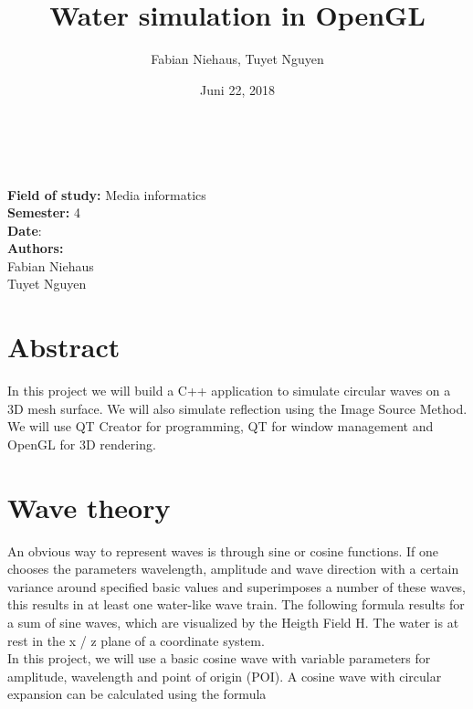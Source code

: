 \documentclass[12pt,a4paper]{scrartcl}
\title{Water simulation in OpenGL}
\author{Fabian Niehaus, Tuyet Nguyen}
\date{Juni 22, 2018}
\begin{document}
\begin{titlepage}
	\centering
	\ \\[2cm]
	{\huge\textbf{\@title}} 
	\\[3cm]
	\large
	\textbf{Field of study:} Media informatics \\
	\textbf{Semester:} 4
	\\[2cm]
	\textbf{Date}: \@date
	\\[2cm]
	\textbf {Authors:}
	\\Fabian Niehaus
	\\Tuyet Nguyen
\end{titlepage}

\newpage
\setcounter{page}{0}
\tableofcontents
\newpage
\listoffigures

\newpage
\ofoot[]{\pagemark}
\normalsize

\section{Abstract}
In this project we will build a C++ application to simulate circular waves on a 3D mesh surface. We will also simulate reflection using the Image Source Method. We will use QT Creator for programming, QT for window management and OpenGL for 3D rendering.

\section{Wave theory}\label{wave-theory}
An obvious way to represent waves is through sine or cosine functions. If one chooses the parameters wavelength, amplitude and wave direction with a certain variance around specified basic values and superimposes a number of these waves, this results in at least one water-like wave train. The following formula results for a sum of sine waves, which are visualized by the Heigth Field H. The water is at rest in the x / z plane of a coordinate system.\\

In this project, we will use a basic cosine wave with variable parameters for amplitude, wavelength and point of origin (POI). A cosine wave with circular expansion can be calculated using the formula
\end{document}

